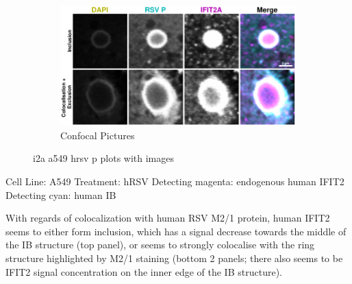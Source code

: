 \begin{figure}
    \begin{subfigure}{1\textwidth}
        \includegraphics[width=1\linewidth]{10. Chapter 5/Figs/01. Infection/01. IFIT2A/06. i2a a549 hrsv p.pdf} 
        \caption[]{Confocal Pictures}
    \end{subfigure}
    \caption[i2a a549 hrsv p plots with images]{i2a a549 hrsv p plots with images}
    \label{fig:i2a a549 hrsv p plots with images}
\end{figure}

Cell Line: A549 \newline
Treatment: hRSV \newline
Detecting magenta: endogenous human IFIT2  \newline
Detecting cyan: human IB \newline

With regards of colocalization with human RSV M2/1 protein, human IFIT2 seems to either form inclusion, which has a signal decrease towards the middle of the IB structure (top panel), or seems to strongly colocalise with the ring structure highlighted by M2/1 staining (bottom 2 panels; there also seems to be IFIT2 signal concentration on the inner edge of the IB structure).

